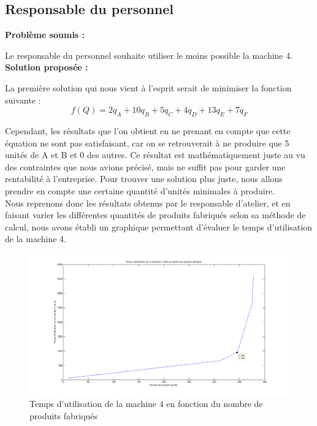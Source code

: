 \documentclass[paper=a4, fontsize=11pt]{scrartcl}
\numberwithin{equation}{section}		%
\numberwithin{figure}{section}			%
\numberwithin{table}{section}				%
\renewcommand{\bf}[1]{\textbf{#1}}
\begin{document}
\subsection{Responsable du personnel}
\bf{Problème soumis :}

Le responsable du personnel souhaite utiliser le moins possible la machine 4.\\

\bf{Solution proposée :}

La première solution qui nous vient à l’esprit serait de minimiser la fonction suivante :\[f(Q) = 2q_A + 10q_B + 5q_C + 4q_D + 13q_E + 7q_F\]

Cependant, les résultats que l’on obtient en ne prenant en compte que cette équation ne sont pas satisfaisant, car on se retrouverait à ne produire que 5 unités de A et B et 0 des autres. Ce résultat est mathématiquement juste au vu des contraintes que nous avions précisé, mais ne suffit pas pour garder une rentabilité à l’entreprise. Pour trouver une solution plus juste, nous allons prendre en compte une certaine quantité d’unités minimales à produire. \\

Nous reprenons donc les résultats obtenus par le responsable d’atelier, et en faisant varier les différentes quantités de produits fabriqués selon sa méthode de calcul, nous avons établi un graphique permettant d’évaluer le temps d’utilisation de la machine 4.\\

\begin{figure}[H]
\caption{Temps d'utilisation de la machine 4 en fonction du nombre de produits fabriqués}
\centering
\includegraphics[width=16cm]{figures/graphe-personnel.png}
\end{figure}
\end{document}
